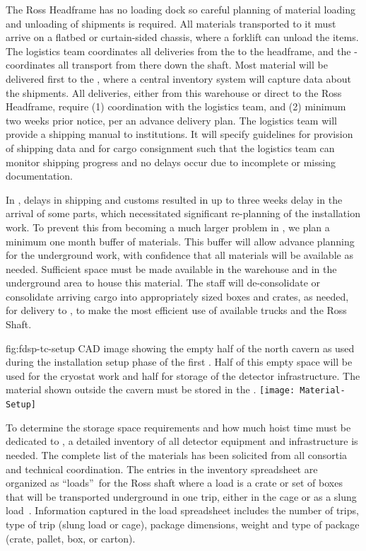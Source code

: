 The Ross Headframe has no loading dock so careful planning of material loading and unloading of shipments is required. 
All materials transported to it must arrive on a flatbed or curtain-sided chassis, where a forklift can unload  the items. 
The logistics team coordinates all deliveries from the  to the headframe, and the - coordinates all transport from there down the shaft.  
Most material will be delivered first to the , where a central inventory system will capture data about the shipments.  
All deliveries, either from this warehouse or direct to the Ross Headframe, require (1) coordination with the logistics team, and (2) minimum two weeks prior notice, per an advance delivery plan.  
The logistics team will provide a shipping manual \cite{bib:docdb13954} to  institutions. 
It will specify guidelines for provision of shipping data and for cargo consignment such that the logistics team can monitor shipping progress and no delays occur due to incomplete or missing documentation. 


In , delays in shipping and customs resulted in up to three weeks delay in the arrival of some parts, which necessitated significant re-planning of the installation work. 
To prevent this from becoming a much larger problem in , we plan a minimum one month buffer of materials. 
This buffer will allow advance planning for the underground work, with confidence that all materials will be available as needed. 
Sufficient space must be made available in the warehouse and in the underground area  to house this material.
The  staff will de-consolidate or consolidate arriving cargo into appropriately sized boxes and crates, as needed, for delivery to , to make the most efficient use of available trucks and the Ross Shaft. 

\begin{dunefigure}{fig:fdsp-tc-setup}
  {CAD image showing the empty half of the north cavern as used during the installation setup phase of the first .  Half of this empty space will be used for the cryostat work and half for storage of the detector infrastructure. The material shown outside the cavern must be stored in the .}
\texttt{[image: Material-Setup]}
\end{dunefigure}


To determine the  storage space requirements and how much hoist time must be dedicated to , a detailed inventory of all detector equipment and  infrastructure is needed. 
The complete list of the materials has been solicited from all consortia and technical coordination. 
The entries in the inventory spreadsheet are organized as \textquotedblleft loads\textquotedblright \ for the Ross shaft where a load is a crate or set of boxes that will be transported underground in one trip, either in the cage or as a slung load~\cite{bib:docdb8426}. 
Information captured in the load spreadsheet includes the number of  
trips, type of trip (slung load or cage), package dimensions, weight and type of package (crate, pallet, box, or carton). 

